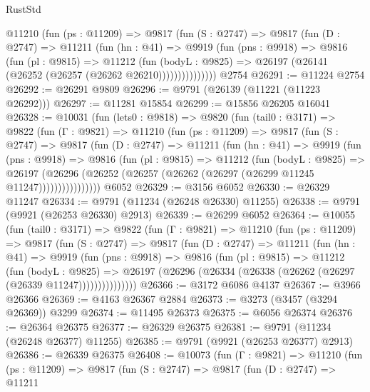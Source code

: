 \begin{lexlean}{RustStd}
\begin{coremodule}
          @11210
            (fun (ps : @11209) =>
            @9817
              (fun (S : @2747) =>
              @9817
                (fun (D : @2747) =>
                @11211
                  (fun (hn : @41) =>
                  @9919
                    (fun (pns : @9918) =>
                    @9816
                      (fun (pl : @9815) =>
                      @11212
                        (fun (bodyL : @9825) =>
                        @26197 (@26141 (@26252 (@26257 (@26262 @26210)))))))))))))))
    @2754
@26291 := @11224 @2754
@26292 := @26291 @9809
@26296 := @9791 (@26139 (@11221 (@11223 @26292)))
@26297 := @11281 @15854
@26299 := @15856 @26205 @16041
@26328 := @10031
    (fun (lets0 : @9818) =>
    @9820
      (fun (tail0 : @3171) =>
      @9822
        (fun (Γ : @9821) =>
        @11210
          (fun (ps : @11209) =>
          @9817
            (fun (S : @2747) =>
            @9817
              (fun (D : @2747) =>
              @11211
                (fun (hn : @41) =>
                @9919
                  (fun (pns : @9918) =>
                  @9816
                    (fun (pl : @9815) =>
                    @11212
                      (fun (bodyL : @9825) =>
                      @26197
                        (@26296
                          (@26252 (@26257 (@26262 (@26297 (@26299 @11245 @11247))))))))))))))))
    @6052
@26329 := @3156 @6052
@26330 := @26329 @11247
@26334 := @9791 (@11234 (@26248 @26330) @11255)
@26338 := @9791 (@9921 (@26253 @26330) @2913)
@26339 := @26299 @6052
@26364 := @10055
    (fun (tail0 : @3171) =>
    @9822
      (fun (Γ : @9821) =>
      @11210
        (fun (ps : @11209) =>
        @9817
          (fun (S : @2747) =>
          @9817
            (fun (D : @2747) =>
            @11211
              (fun (hn : @41) =>
              @9919
                (fun (pns : @9918) =>
                @9816
                  (fun (pl : @9815) =>
                  @11212
                    (fun (bodyL : @9825) =>
                    @26197 (@26296 (@26334 (@26338 (@26262 (@26297 (@26339 @11247)))))))))))))))
@26366 := @3172 @6086 @4137
@26367 := @3966 @26366
@26369 := @4163 @26367 @2884
@26373 := @3273 (@3457 (@3294 @26369)) @3299
@26374 := @11495 @26373
@26375 := @6056 @26374
@26376 := @26364 @26375
@26377 := @26329 @26375
@26381 := @9791 (@11234 (@26248 @26377) @11255)
@26385 := @9791 (@9921 (@26253 @26377) @2913)
@26386 := @26339 @26375
@26408 := @10073
    (fun (Γ : @9821) =>
    @11210
      (fun (ps : @11209) =>
      @9817
        (fun (S : @2747) =>
        @9817
          (fun (D : @2747) =>
          @11211

\end{coremodule}
\end{lexlean}
